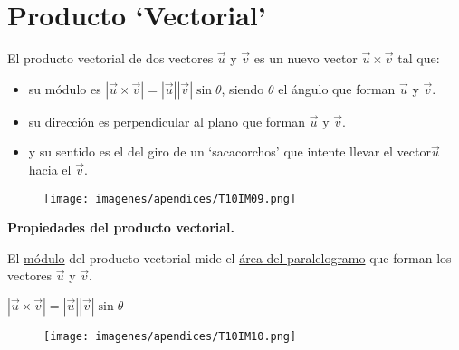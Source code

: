 \section{Producto `Vectorial'}

El producto vectorial de dos vectores $\vec u$ y $\vec v$ es un nuevo vector $\vec u \times \vec v$	 tal que:
\begin{multicols}{2}
\begin{itemize}
\item su módulo es $|\vec u \times \vec v|=|\vec u||\vec v| \sin \theta $, siendo $\theta$ el ángulo que forman $\vec u$ y $\vec v$.
\item su dirección es perpendicular al plano que forman $\vec u$ y $\vec v$.
\item y su sentido es el del giro de un `sacacorchos' que intente llevar el vector$\vec u$ hacia el $\vec v$.
\end{itemize}
\begin{figure}[H]
	\centering
	\texttt{[image: imagenes/apendices/T10IM09.png]}
\end{figure}
\end{multicols}

\textbf{Propiedades del producto vectorial.}
\begin{multicols}{2}

El \underline{módulo} del producto vectorial mide el \underline{área del paralelogramo} que forman los vectores $\vec u$ y $\vec v$.
				
\hspace{10mm}$|\vec u \times \vec v|=|\vec u||\vec v| \sin \theta$

\begin{figure}[H]
	\centering
	\texttt{[image: imagenes/apendices/T10IM10.png]}
\end{figure}

\end{multicols}

